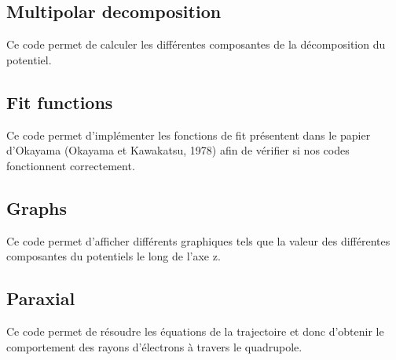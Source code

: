\documentclass{report}
\begin{document}
\subsection{Multipolar decomposition}
Ce code permet de calculer les différentes composantes de la décomposition du potentiel.



\subsection{Fit functions}
Ce code permet d'implémenter les fonctions de fit présentent dans le papier d'Okayama (Okayama et Kawakatsu, 1978) afin de vérifier si nos codes 
fonctionnent correctement.



\subsection{Graphs}
Ce code permet d'afficher différents graphiques tels que la valeur des différentes composantes du potentiels le long de l'axe z.



\subsection{Paraxial}
Ce code permet de résoudre les équations de la trajectoire et donc d'obtenir le comportement des rayons d'électrons à travers le quadrupole.

\end{document}
